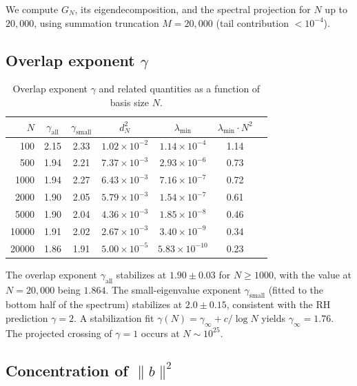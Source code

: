 \documentclass[11pt,a4paper]{article}
\begin{document}
We compute $G_N$, its eigendecomposition, and the spectral projection for $N$ up to $20{,}000$, using summation truncation $M = 20{,}000$ (tail contribution $< 10^{-4}$).

\subsection{Overlap exponent $\gamma$}

\begin{table}[h]
\centering
\caption{Overlap exponent $\gamma$ and related quantities as a function of basis size $N$.}
\label{tab:gamma}
\begin{tabular}{@{}rcccccc@{}}
\toprule
$N$ & $\gamma_{\text{all}}$ & $\gamma_{\text{small}}$ & $d_N^2$ & $\lambda_{\min}$ & $\lambda_{\min} \cdot N^2$ \\
\midrule
100 & 2.15 & 2.33 & $1.02 \times 10^{-2}$ & $1.14 \times 10^{-4}$ & 1.14 \\
500 & 1.94 & 2.21 & $7.37 \times 10^{-3}$ & $2.93 \times 10^{-6}$ & 0.73 \\
1000 & 1.94 & 2.27 & $6.43 \times 10^{-3}$ & $7.16 \times 10^{-7}$ & 0.72 \\
2000 & 1.90 & 2.05 & $5.79 \times 10^{-3}$ & $1.54 \times 10^{-7}$ & 0.61 \\
5000 & 1.90 & 2.04 & $4.36 \times 10^{-3}$ & $1.85 \times 10^{-8}$ & 0.46 \\
10000 & 1.91 & 2.02 & $2.67 \times 10^{-3}$ & $3.40 \times 10^{-9}$ & 0.34 \\
20000 & 1.86 & 1.91 & $5.00 \times 10^{-5}$ & $5.83 \times 10^{-10}$ & 0.23 \\
\bottomrule
\end{tabular}
\end{table}

The overlap exponent $\gamma_{\text{all}}$ stabilizes at $1.90 \pm 0.03$ for $N \geq 1000$, with the value at $N = 20{,}000$ being $1.864$. The small-eigenvalue exponent $\gamma_{\text{small}}$ (fitted to the bottom half of the spectrum) stabilizes at $2.0 \pm 0.15$, consistent with the RH prediction $\gamma = 2$. A stabilization fit $\gamma(N) = \gamma_\infty + c / \log N$ yields $\gamma_\infty = 1.76$. The projected crossing of $\gamma = 1$ occurs at $N \sim 10^{25}$.

\subsection{Concentration of $\|b\|^2$}
\end{document}
